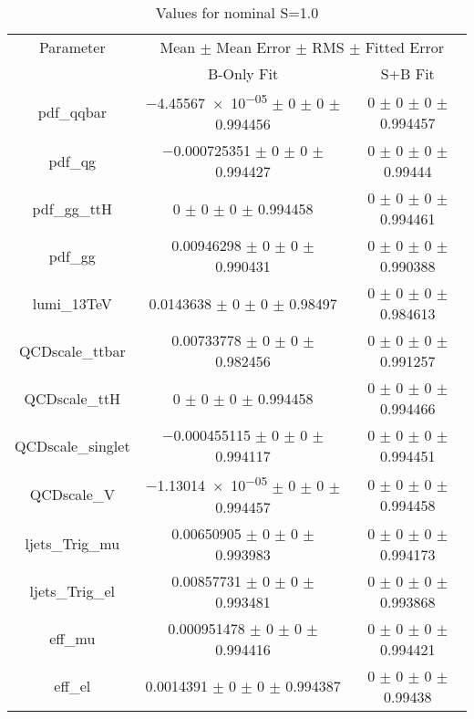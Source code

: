 \begin{table}
\centering
\caption{Values for nominal S=1.0}
\begin{tabular}{ccc}
\toprule
Parameter 	& \multicolumn{2}{c}{Mean $\pm$ Mean Error $\pm$ RMS $\pm$ Fitted Error}\\
 	& B-Only Fit & S+B Fit\\
\midrule
pdf\_qqbar 	& \num{-4.45567e-05} $\pm$ \num{0} $\pm$ \num{0} $\pm$ \num{0.994456} 	& \num{0} $\pm$ \num{0} $\pm$ \num{0} $\pm$ \num{0.994457}\\
pdf\_qg 	& \num{-0.000725351} $\pm$ \num{0} $\pm$ \num{0} $\pm$ \num{0.994427} 	& \num{0} $\pm$ \num{0} $\pm$ \num{0} $\pm$ \num{0.99444}\\
pdf\_gg\_ttH 	& \num{0} $\pm$ \num{0} $\pm$ \num{0} $\pm$ \num{0.994458} 	& \num{0} $\pm$ \num{0} $\pm$ \num{0} $\pm$ \num{0.994461}\\
pdf\_gg 	& \num{0.00946298} $\pm$ \num{0} $\pm$ \num{0} $\pm$ \num{0.990431} 	& \num{0} $\pm$ \num{0} $\pm$ \num{0} $\pm$ \num{0.990388}\\
lumi\_13TeV 	& \num{0.0143638} $\pm$ \num{0} $\pm$ \num{0} $\pm$ \num{0.98497} 	& \num{0} $\pm$ \num{0} $\pm$ \num{0} $\pm$ \num{0.984613}\\
QCDscale\_ttbar 	& \num{0.00733778} $\pm$ \num{0} $\pm$ \num{0} $\pm$ \num{0.982456} 	& \num{0} $\pm$ \num{0} $\pm$ \num{0} $\pm$ \num{0.991257}\\
QCDscale\_ttH 	& \num{0} $\pm$ \num{0} $\pm$ \num{0} $\pm$ \num{0.994458} 	& \num{0} $\pm$ \num{0} $\pm$ \num{0} $\pm$ \num{0.994466}\\
QCDscale\_singlet 	& \num{-0.000455115} $\pm$ \num{0} $\pm$ \num{0} $\pm$ \num{0.994117} 	& \num{0} $\pm$ \num{0} $\pm$ \num{0} $\pm$ \num{0.994451}\\
QCDscale\_V 	& \num{-1.13014e-05} $\pm$ \num{0} $\pm$ \num{0} $\pm$ \num{0.994457} 	& \num{0} $\pm$ \num{0} $\pm$ \num{0} $\pm$ \num{0.994458}\\
ljets\_Trig\_mu 	& \num{0.00650905} $\pm$ \num{0} $\pm$ \num{0} $\pm$ \num{0.993983} 	& \num{0} $\pm$ \num{0} $\pm$ \num{0} $\pm$ \num{0.994173}\\
ljets\_Trig\_el 	& \num{0.00857731} $\pm$ \num{0} $\pm$ \num{0} $\pm$ \num{0.993481} 	& \num{0} $\pm$ \num{0} $\pm$ \num{0} $\pm$ \num{0.993868}\\
eff\_mu 	& \num{0.000951478} $\pm$ \num{0} $\pm$ \num{0} $\pm$ \num{0.994416} 	& \num{0} $\pm$ \num{0} $\pm$ \num{0} $\pm$ \num{0.994421}\\
eff\_el 	& \num{0.0014391} $\pm$ \num{0} $\pm$ \num{0} $\pm$ \num{0.994387} 	& \num{0} $\pm$ \num{0} $\pm$ \num{0} $\pm$ \num{0.99438}\\

\end{tabular}
\end{table}
